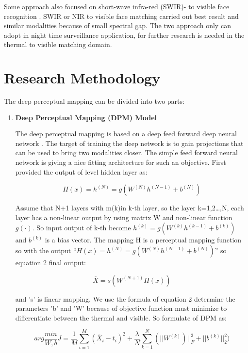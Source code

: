 \documentclass[a4paper, 12pt]{article}
\begin{document}
Some approach also focused on short-wave infra-red (SWIR)- to visible face recognition \cite{16} \cite{17}. SWIR or NIR to visible face matching carried out best result and similar modalities because of small spectral gap. The two approach only can adopt in night time surveillance application, for further research is needed in the thermal to visible matching domain.

\section{Research Methodology} 

The deep perceptual mapping \cite{DBLP:journals/corr/SarfrazS15} can be divided into two parts:

\begin{enumerate}[I]

\item \textbf{{\large Deep Perceptual Mapping (DPM) Model}}

 The deep perceptual mapping is based on a deep feed forward deep neural network \cite{5}. The target of training the deep network is to gain projections that can be used to bring two modalities closer. The simple feed forward neural network is giving a nice fitting architecture for such an objective. First provided the output of level hidden layer as:
 
 \begin{equation}
H(x) = h^{(N)} = g(W^{(N)}h^{(N-1)} +b^{(N)})
\end{equation}
 
 Assume that N+1 layers with m(k)in k-th layer, so the layer k=1,2…,N, each layer has a non-linear output by using matrix W and non-linear function $g(\cdot )$. So input output of k-th become $h^{(k)} = g(W^{(k)}h^{(k-1)} +b^{(k)})$ and $b^{(k)}$ is a bias vector. The mapping H is a perceptual mapping function so with the output “$H(x) = h^{(N)} = g(W^{(N)}h^{(N-1)} +b^{(N)})$” so equation 2 final output:
 
 \begin{equation}
  \overline{X} = s(W^{(N+1)}H(x))
  \end{equation}
  
   and 's' is linear mapping. We use the formula of equation 2 determine the parameters 'b' and 'W' because of objective function must minimize to differentiate between the thermal and visible. So formulate of DPM as:
   
\begin{equation}
arg \frac{min}{W,b} J = \frac{1}{M} \sum_{i=1}^{M} ({\overline{X}}_{i}-{t}_{i})^2 + \frac{\lambda}{N} \sum_{k=1}^{N} (||W^{(k)})|| _{F}^{2} + || b^{(k)}|| _{2}^{2})
 \end{equation}
 

\end{enumerate}
\end{document}
